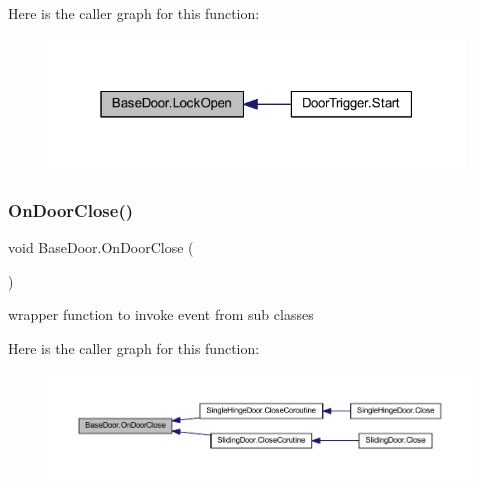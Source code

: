 Here is the caller graph for this function\+:
\nopagebreak
\begin{figure}[H]
\begin{center}
\leavevmode
\includegraphics[width=313pt]{class_base_door_a9a851525c3b6e878bec459992ac75408_icgraph}
\end{center}
\end{figure}
\mbox{\label{class_base_door_a3ce14aa6aca622f9d18e7054e76ec8d2}} 
\subsubsection{\texorpdfstring{On\+Door\+Close()}{OnDoorClose()}}
{\footnotesize\ttfamily void Base\+Door.\+On\+Door\+Close (\begin{DoxyParamCaption}{ }\end{DoxyParamCaption})\hspace{0.3cm}{\ttfamily [protected]}}



wrapper function to invoke event from sub classes 

Here is the caller graph for this function\+:
\nopagebreak
\begin{figure}[H]
\begin{center}
\leavevmode
\includegraphics[width=350pt]{class_base_door_a3ce14aa6aca622f9d18e7054e76ec8d2_icgraph}
\end{center}
\end{figure}
\mbox{\label{class_base_door_af53bd804dcee24b1f2019c2d2e8e03c6}} 
